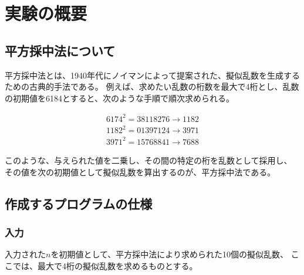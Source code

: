 

\section{実験の概要}
\subsection{平方採中法について}
  平方採中法とは、1940年代にノイマンによって提案された、擬似乱数を生成するための古典的手法である。
  例えば、求めたい乱数の桁数を最大で4桁とし、乱数の初期値を6184とすると、次のような手順で順次求められる。

  \begin{align*}
    6174^2 = 38118276 → 1182 \\
    1182^2 = 01397124 → 3971 \\
    3971^2 = 15768841 → 7688
  \end{align*}

  このような、与えられた値を二乗し、その間の特定の桁を乱数として採用し、
  その値を次の初期値として擬似乱数を算出するのが、平方採中法である。

\subsection{作成するプログラムの仕様}
  \subsubsection{入力}
    入力された$n$を初期値として、平方採中法により求められた10個の擬似乱数、
    ここでは、最大で4桁の擬似乱数を求めるものとする。



